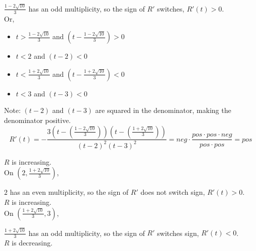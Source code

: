 \documentclass{ximera}
\begin{document}
\begin{example}
$\frac{1 - 2 \sqrt{10}}{3}$ has an odd multiplicity, so the sign of $R'$ switches, $R'(t) > 0$. \\




Or, 




\begin{itemize}
\item $t > \frac{1 - 2 \sqrt{10}}{3}$ and $\left( t - \frac{1 - 2 \sqrt{10}}{3} \right) > 0$
\item $t < 2$ and $(t - 2) < 0$
\item $t < \frac{1 + 2 \sqrt{10}}{3}$ and $\left( t - \frac{1 + 2 \sqrt{10}}{3} \right) < 0$
\item $t < 3$ and $(t - 3) < 0$
\end{itemize}

Note: $(t-2)$ and $(t-3)$ are squared in the denominator, making the denominator positive. \\



\[   
R'(t) = -\frac{3 \left(t - \left(\frac{1 - 2 \sqrt{10}}{3} \right) \right) \left(t - \left(\frac{1 + 2 \sqrt{10}}{3} \right) \right) }{ (t-2)^2 (t-3)^2 }  = neg \cdot \frac{pos \cdot pos \cdot neg}{pos \cdot pos} = pos
\]


$R$ is increasing. \\











On $\left( 2, \frac{1 + 2 \sqrt{10}}{3} \right)$, 


$2$ has an even multiplicity, so the sign of $R'$ does not switch sign, $R'(t) > 0$. \\


$R$ is increasing. \\






On $\left( \frac{1 + 2 \sqrt{10}}{3}, 3 \right)$, 


$\frac{1 + 2 \sqrt{10}}{3}$ has an odd multiplicity, so the sign of $R'$ switches sign, $R'(t) < 0$. \\


$R$ is decreasing. \\










\end{example}
\end{document}
